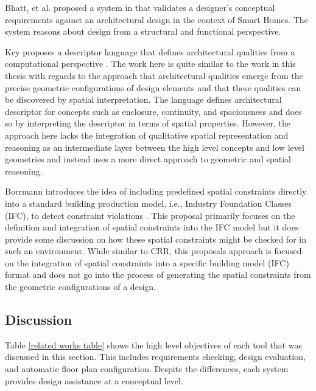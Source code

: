 \documentclass[12pt]{ucthesis}
\begin{document}
Bhatt, et al. proposed a system in \cite{BhattDH09} that validates a designer's conceptual requirements against an architectural design in the context of Smart Homes. The system reasons about design from a structural and functional perspective.   

Key proposes a descriptor language that defines architectural qualities from a computational perspective \cite{Key}. The work here is quite similar to the work in this thesis with regards to the approach that architectural qualities emerge from the precise geometric configurations of design elements and that these qualities can be discovered by spatial interpretation. The language defines architectural descriptor for concepts such as enclosure, continuity, and spaciousness and does so by interpreting the descriptor in terms of spatial properties. However, the approach here lacks the integration of qualitative spatial representation and reasoning as an intermediate layer between the high level concepts and low level geometries and instead uses a more direct approach to geometric and spatial reasoning.

Borrmann introduces the idea of including predefined spatial constraints directly into a standard building production model, i.e., Industry Foundation Classes (IFC), to detect constraint violations \cite{Borrmann}. This proposal primarily focuses on the definition and integration of spatial constraints into the IFC model but it does provide some discussion on how these spatial constraints might be checked for in such an environment. While similar to CRR, this proposals approach is focused on the integration of spatial constraints into a specific building model (IFC) format and does not go into the process of generating the spatial constraints from the geometric configurations of a design. 

\subsection{Discussion}
Table \ref{related works table} shows the high level objectives of each tool that was discussed in this section. This includes requirements checking, design evaluation, and automatic floor plan configuration. Despite the differences, each system provides design assistance at a conceptual level.
\end{document}
